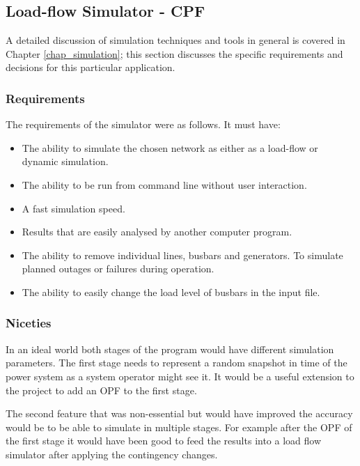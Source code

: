 \documentclass[a4paper,oneside,12pt]{report}
\begin{document}
\subsection{Load-flow Simulator - CPF}

A detailed discussion of simulation techniques and tools in general is covered in Chapter \ref{chap_simulation}; this section discusses the specific requirements and decisions for this particular application.

\subsubsection{Requirements}
The requirements of the simulator were as follows. It must have:

\begin{itemize}
\item The ability to simulate the chosen network as either as a load-flow or dynamic simulation.
\item The ability to be run from command line without user interaction.
\item A fast simulation speed.
\item Results that are easily analysed by another computer program.
\item The ability to remove individual lines, busbars and generators. To simulate planned outages or failures during operation.
\item The ability to easily change the load level of busbars in the input file.
\end{itemize}

\subsubsection{Niceties}

In an ideal world both stages of the program would have different simulation parameters. The first stage needs to represent a random snapshot in time of the power system as a system operator might see it. It would be a useful extension to the project to add an OPF to the first stage. 

The second feature that was non-essential but would have improved the accuracy would be to be able to simulate in multiple stages. For example after the OPF of the first stage it would have been good to feed the results into a load flow simulator after applying the contingency changes. 
\end{document}
